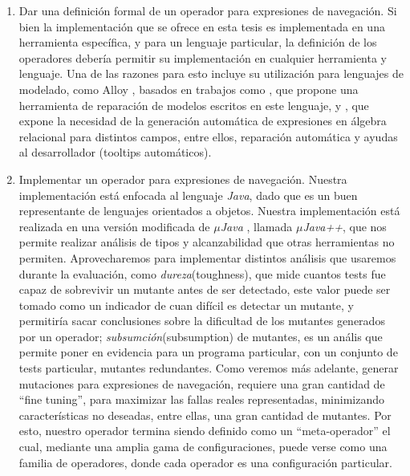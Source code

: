 \begin{enumerate}
	\item Dar una definici\'on formal de un operador para expresiones de navegaci\'on. Si bien la implementaci\'on que se ofrece en esta tesis es implementada en una herramienta espec\'ifica, y para un lenguaje particular, la definici\'on de los operadores deber\'ia permitir su implementaci\'on en cualquier herramienta y lenguaje. Una de las razones para esto incluye su utilizaci\'on para lenguajes de modelado, como Alloy \cite{bibliography.books.SoftwareAbstractions-alloy}, basados en trabajos como \cite{bibliography.repair.mutation.AlloyWang18}, que propone una herramienta de reparaci\'on de modelos escritos en este lenguaje, y \cite{bibliography.algebraicExpressions.RexGenWang18}, que expone la necesidad de la generaci\'on autom\'atica de expresiones en \'algebra relacional para distintos campos, entre ellos, reparaci\'on autom\'atica y ayudas al desarrollador (tooltips autom\'aticos).
	
	\item Implementar un operador para expresiones de navegaci\'on. Nuestra implementaci\'on est\'a enfocada al lenguaje \emph{Java}, dado que es un buen representante de lenguajes orientados a objetos. Nuestra implementaci\'on est\'a realizada en una versi\'on modificada de \emph{$\mu$Java} \cite{bibliography.mutation.tools.muJavaMaOK05}, llamada \emph{$\mu$Java++}, que nos permite realizar an\'alisis de tipos y alcanzabilidad que otras herramientas no permiten. Aprovecharemos para implementar distintos an\'alisis que usaremos durante la evaluaci\'on, como \emph{dureza}(toughness), que mide cuantos tests fue capaz de sobrevivir un mutante antes de ser detectado, este valor puede ser tomado como un indicador de cuan dif\'icil es detectar un mutante, y permitir\'ia sacar conclusiones sobre la dificultad de los mutantes generados por un operador; \emph{subsumci\'on}(subsumption) de mutantes, es un an\'alis que permite poner en evidencia para un programa particular, con un conjunto de tests particular, mutantes redundantes. Como veremos m\'as adelante, generar mutaciones para expresiones de navegaci\'on, requiere una gran cantidad de ``fine tuning'', para maximizar las fallas reales representadas, minimizando caracter\'isticas no deseadas, entre ellas, una gran cantidad de mutantes. Por esto, nuestro operador termina siendo definido como un ``meta-operador'' el cual, mediante una amplia gama de configuraciones, puede verse como una familia de operadores, donde cada operador es una configuraci\'on particular.
\end{enumerate}


